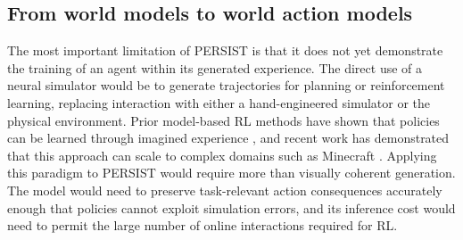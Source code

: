 \subsection{From world models to world action models}
The most important limitation of PERSIST is that it does not yet demonstrate the training of an agent within its generated experience. The direct use of a neural simulator would be to generate trajectories for planning or reinforcement learning, replacing interaction with either a hand-engineered simulator or the physical environment. Prior model-based RL methods have shown that policies can be learned through imagined experience \citep{hafner2025mastering,alonso2024diffusion,micheli2023transformers}, and recent work has demonstrated that this approach can scale to complex domains such as Minecraft \citep{hafner2025training}. Applying this paradigm to PERSIST would require more than visually coherent generation. The model would need to preserve task-relevant action consequences accurately enough that policies cannot exploit simulation errors, and its inference cost would need to permit the large number of online interactions required for RL.

